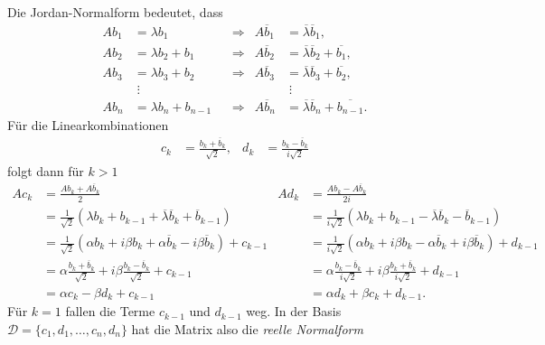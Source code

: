 Die Jordan-Normalform bedeutet, dass
\[
\begin{aligned}
Ab_1&=\lambda b_1           &&\Rightarrow&
	A\overline{b}_1 &= \overline{\lambda} \overline{b}_1,      \\
Ab_2&=\lambda b_2 + b_1     &&\Rightarrow&
	A\overline{b}_2 &= \overline{\lambda} \overline{b}_2 +\overline{b_1},\\
Ab_3&=\lambda b_3 + b_2     &&\Rightarrow&
	A\overline{b}_3 &= \overline{\lambda} \overline{b}_3 +\overline{b_2},\\
    &\;\vdots               &&           &
	                 &\;\vdots \\
Ab_n&=\lambda b_n + b_{n-1} &&\Rightarrow&
	A\overline{b}_n &= \overline{\lambda} \overline{b}_n +\overline{b_{n-1}}.
\end{aligned}
\]
Für die Linearkombinationen
\begin{equation}
\begin{aligned}
c_k &= \frac{b_k+\overline{b}_k}{\sqrt{2}},
&
d_k &= \frac{b_k-\overline{b}_k}{i\sqrt{2}}
\end{aligned}
\label{buch:eigenwerte:eqn:reellenormalformumrechnung}
\end{equation}
folgt dann für $k>1$
\begin{align*}
Ac_k
&=
\frac{Ab_k+A\overline{b}_k}{2}
&
Ad_k
&=
\frac{Ab_k-A\overline{b}_k}{2i}
\\
&=
\frac1{\sqrt{2}}(\lambda b_k + b_{k-1}
+ \overline{\lambda}\overline{b}_k + \overline{b}_{k-1})
&
&=
\frac1{i\sqrt{2}}(\lambda b_k + b_{k-1}
- \overline{\lambda}\overline{b}_k - \overline{b}_{k-1})
\\
&=
\frac1{\sqrt{2}}(\alpha b_k + i\beta b_k + \alpha \overline{b}_k -i\beta \overline{b}_k)
+
c_{k-1}
&
&=
\frac1{i\sqrt{2}}(
\alpha b_k + i\beta b_k - \alpha \overline{b}_k +i\beta \overline{b}_k)
+
d_{k-1}
\\
&=
\alpha
\frac{b_k+\overline{b}_k}{\sqrt{2}}
+
i \beta \frac{b_k-\overline{b}_k}{\sqrt{2}}
+
c_{k-1}
&
&=
\alpha
\frac{b_k-\overline{b}_k}{i\sqrt{2}}
+
i \beta \frac{b_k+\overline{b}_k}{i\sqrt{2}}
+
d_{k-1}
\\
&= \alpha c_k -\beta d_k
+
c_{k-1}
&
&= \alpha d_k + \beta c_k
+
d_{k-1}.
\end{align*}
Für $k=1$ fallen die Terme $c_{k-1}$ und $d_{k-1}$ weg.
In der Basis $\mathcal{D}=\{c_1,d_1,\dots,c_n,d_n\}$ hat die Matrix
also die {\em reelle Normalform}
%
%
